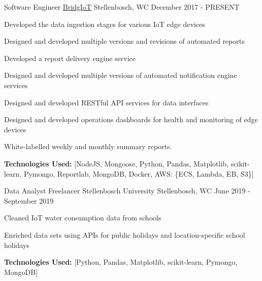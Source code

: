 
\begin{cventries}
  \cventry
    {Software Engineer} %
    {\href{https://www.bridgiot.co.za/}{BridgIoT}} %
    {Stellenbosch, WC} %
    {December 2017 - PRESENT} %
    {
      \begin{cvitems} %
        \item {Developed the data ingestion stages for various IoT edge devices}
        \item {Designed and developed multiple versions and revisions of automated reports}
        \item {Developed a report delivery engine service}
        \item {Designed and developed multiple versions of automated notification engine services}
        \item {Designed and developed RESTful API services for data interfaces}
        \item {Designed and developed operations dashboards for health and monitoring of edge devices}
        \item {White-labelled weekly and monthly summary reports.}
        \item {\textbf{Technologies Used:} [NodeJS, Mongoose,
                                            Python, Pandas, Matplotlib, scikit-learn, Pymongo, Reportlab,
                                            MongoDB,
                                            Docker,
                                            AWS: \{ECS, Lambda, EB, S3\}]}
      \end{cvitems}
    }

  \cventry
    {Data Analyst Freelancer} %
    {Stellenbosch University} %
    {Stellenbosch, WC} %
    {June 2019 - September 2019} %
    {
      \begin{cvitems} %
        \item {Cleaned IoT water consumption data from schools}
        \item {Enriched data sets using APIs for public holidays and location-specific school holidays}
        \item {\textbf{Technologies Used:} [Python, Pandas, Matplotlib, scikit-learn, Pymongo,
                                            MongoDB]}
      \end{cvitems}
    }


\end{cventries}

